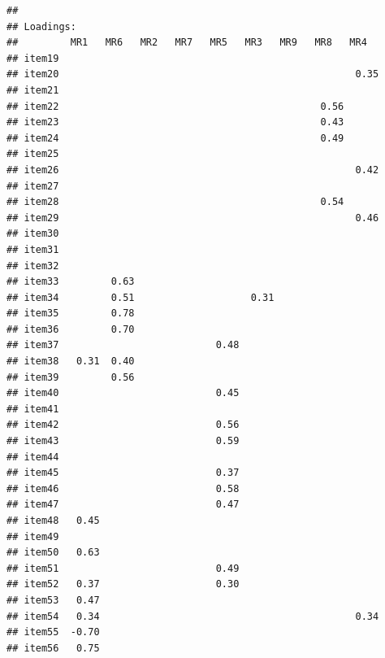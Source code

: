 \documentclass[
  english,
  man]{apa6}
\begin{document}
\begin{verbatim}
## 
## Loadings:
##         MR1   MR6   MR2   MR7   MR5   MR3   MR9   MR8   MR4  
## item19                                                       
## item20                                                   0.35
## item21                                                       
## item22                                             0.56      
## item23                                             0.43      
## item24                                             0.49      
## item25                                                       
## item26                                                   0.42
## item27                                                       
## item28                                             0.54      
## item29                                                   0.46
## item30                                                       
## item31                                                       
## item32                                                       
## item33         0.63                                          
## item34         0.51                    0.31                  
## item35         0.78                                          
## item36         0.70                                          
## item37                           0.48                        
## item38   0.31  0.40                                          
## item39         0.56                                          
## item40                           0.45                        
## item41                                                       
## item42                           0.56                        
## item43                           0.59                        
## item44                                                       
## item45                           0.37                        
## item46                           0.58                        
## item47                           0.47                        
## item48   0.45                                                
## item49                                                       
## item50   0.63                                                
## item51                           0.49                        
## item52   0.37                    0.30                        
## item53   0.47                                                
## item54   0.34                                            0.34
## item55  -0.70                                                
## item56   0.75                                                

\end{verbatim}
\end{document}
